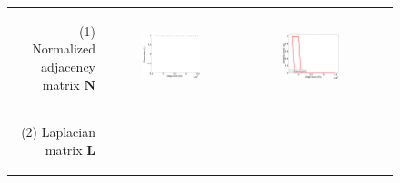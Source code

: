 \documentclass[11pt,a4paper]{book}
\newcommand{\wTwoMinusLabel}{0.45}
\begin{document}
\begin{figure}[h!]
  \centering
  \begin{tabular}{rccc}
    \begin{sideways}(1) Normalized adjacency matrix $\mathbf N$ \end{sideways} &
    \includegraphics[width=\wTwoMinusLabel\textwidth]{img-st/time.spectrum-flat.sym-n.epinions} &
    \includegraphics[width=\wTwoMinusLabel\textwidth]{img-st/time.eigenvalue_evolution.sym-n.epinions}  \\
    \begin{sideways}(2) Laplacian matrix $\mathbf L$ \end{sideways} &

\end{tabular}
\end{figure}
\end{document}

